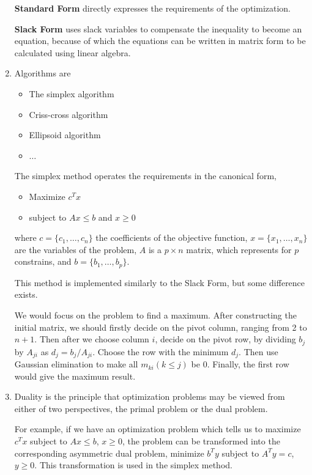 \documentclass[12pt, a4paper]{article}
\begin{document}
\begin{enumerate}
          \textbf{Standard Form} directly expresses the requirements of the optimization.

          \textbf{Slack Form} uses slack variables to compensate the inequality to become an equation, 
          because of which the equations can be written in matrix form to be calculated using linear algebra.
    \item Algorithms are 
          \begin{itemize}
              \item The simplex algorithm
              \item Criss-cross algorithm
              \item Ellipsoid algorithm
              \item $\dots$
          \end{itemize}

          The simplex method operates the requirements in the canonical form,
          \begin{itemize}
              \item Maximize $c^Tx$
              \item subject to $Ax \leq b$ and $x \geq 0$
          \end{itemize}
          where $c = \{c_1, \dots, c_n\}$ the coefficients of the objective function, 
          $x = \{x_1, \dots, x_n\}$ are the variables of the problem, 
          $A$ is a $p\times n$ matrix, which represents for $p$ constrains, 
          and $b = \{b_1, \dots, b_p\}$.

          This method is implemented similarly to the Slack Form, but some difference exists.

          We would focus on the problem to find a maximum. 
          After constructing the initial matrix, we should firstly decide on the pivot column, ranging from 2 to $n+1$. 
          Then after we choose column $i$, decide on the pivot row, by dividing $b_j$ by $A_{ji}$ as $d_j = b_j / A_{ji}$. 
          Choose the row with the minimum $d_j$. Then use Gaussian elimination to make all $m_{ki}(k \leq j)$ be 0. 
          Finally, the first row would give the maximum result.
    \item Duality is the principle that optimization problems may be viewed from either of two perspectives, 
          the primal problem or the dual problem.

          For example, if we have an optimization problem which tells us to maximize $c^Tx$ subject to $Ax \leq b$, $x \geq 0$, 
          the problem can be transformed into the corresponding asymmetric dual problem, 
          minimize $b^Ty$ subject to $A^Ty = c$, $y \geq 0$.
          This transformation is used in the simplex method.
\end{enumerate}
\end{document}
